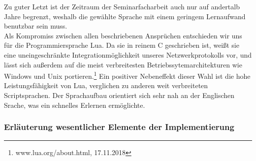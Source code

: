\documentclass[12pt, a4paper]{scrartcl}
\begin{document}
Zu guter Letzt ist der Zeitraum der Seminarfacharbeit auch nur auf andertalb Jahre begrenzt, weshalb die gewählte Sprache mit einem geringem Lernaufwand benutzbar sein muss.\\
Als Kompromiss zwischen allen beschriebenen Ansprüchen entschieden wir uns für die Programmiersprache Lua. Da sie in reinem C geschrieben ist, weißt sie eine uneingeschränkte Integrationmöglichkeit unseres Netzwerkprotokolls vor, und lässt sich außerdem auf die meist verbreitesten Betriebssytemarchitekturen wie Windows und Unix portieren.\footnote{www.lua.org/about.html, 17.11.2018} Ein positiver Nebeneffekt dieser Wahl ist die hohe Leistungsfähigkeit von Lua, verglichen zu anderen weit verbreiteten Scriptsprachen. Der Sprachaufbau orientiert sich sehr nah an der Englischen Srache, was ein schnelles Erlernen ermöglichte. 


\subsubsection{Erläuterung wesentlicher Elemente der Implementierung}
\end{document}
